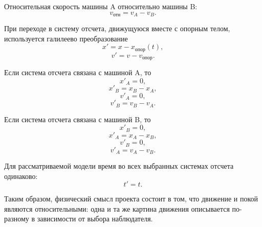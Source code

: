 \documentclass[12pt,a4paper]{article}
\begin{document}
Относительная скорость машины A относительно машины B:
\begin{equation}
 v_{\text{отн}}=v_A-v_B.
\end{equation}

При переходе в систему отсчета, движущуюся вместе с опорным телом, используется галилеево преобразование
\begin{equation}
 x'=x-x_{\text{опор}}(t),
\end{equation}
\begin{equation}
 v'=v-v_{\text{опор}}.
\end{equation}

Если система отсчета связана с машиной A, то
\begin{equation}
 x'_A=0,
\end{equation}
\begin{equation}
 x'_B=x_B-x_A,
\end{equation}
\begin{equation}
 v'_A=0,
\end{equation}
\begin{equation}
 v'_B=v_B-v_A.
\end{equation}

Если система отсчета связана с машиной B, то
\begin{equation}
 x'_B=0,
\end{equation}
\begin{equation}
 x'_A=x_A-x_B,
\end{equation}
\begin{equation}
 v'_B=0,
\end{equation}
\begin{equation}
 v'_A=v_A-v_B.
\end{equation}

Для рассматриваемой модели время во всех выбранных системах отсчета одинаково:
\begin{equation}
 t'=t.
\end{equation}

Таким образом, физический смысл проекта состоит в том, что движение и покой являются относительными: одна и та же картина движения описывается по-разному в зависимости от выбора наблюдателя.
\end{document}
